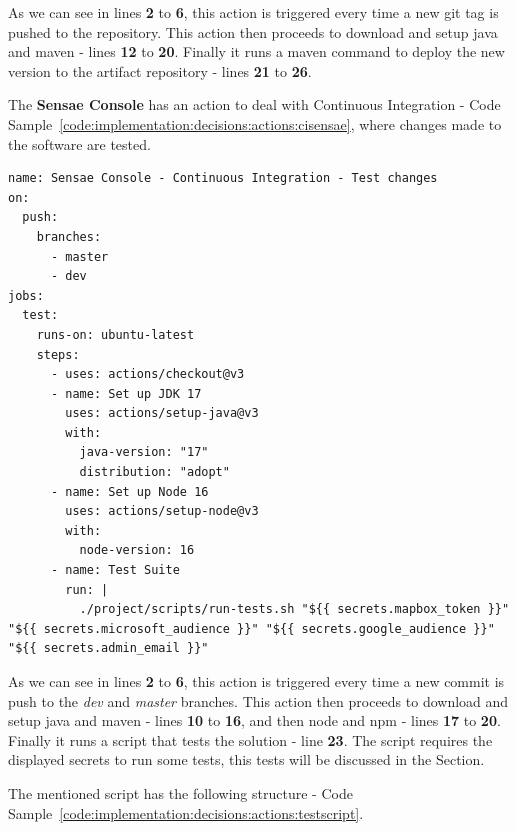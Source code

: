 As we can see in lines \textbf{2} to \textbf{6}, this action is triggered every time a new git tag is pushed to the repository.
This action then proceeds to download and setup java and maven - lines \textbf{12} to \textbf{20}. Finally it runs a maven command to deploy the new version to the artifact repository - lines \textbf{21} to \textbf{26}.

The \textbf{Sensae Console} has an action to deal with Continuous Integration - Code Sample~\ref{code:implementation:decisions:actions:cisensae}, where changes made to the software are tested.

\begin{lstlisting}[style=yaml, caption=Configuration File for \textbf{Sensae Console} Continuous Integration, label={code:implementation:decisions:actions:cisensae}]
name: Sensae Console - Continuous Integration - Test changes
on:
  push:
    branches:
      - master
      - dev
jobs:
  test:
    runs-on: ubuntu-latest
    steps:
      - uses: actions/checkout@v3
      - name: Set up JDK 17
        uses: actions/setup-java@v3
        with:
          java-version: "17"
          distribution: "adopt"
      - name: Set up Node 16
        uses: actions/setup-node@v3
        with:
          node-version: 16
      - name: Test Suite
        run: |
          ./project/scripts/run-tests.sh "${{ secrets.mapbox_token }}" "${{ secrets.microsoft_audience }}" "${{ secrets.google_audience }}" "${{ secrets.admin_email }}"

\end{lstlisting}

As we can see in lines \textbf{2} to \textbf{6}, this action is triggered every time a new commit is push to the \textit{dev} and \textit{master} branches.
This action then proceeds to download and setup java and maven - lines \textbf{10} to \textbf{16}, and then node and npm - lines \textbf{17} to \textbf{20}. Finally it runs a script that tests the solution - line \textbf{23}. The script requires the displayed secrets to run some tests, this tests will be discussed in the  Section.

The mentioned script has the following structure - Code Sample~\ref{code:implementation:decisions:actions:testscript}.

